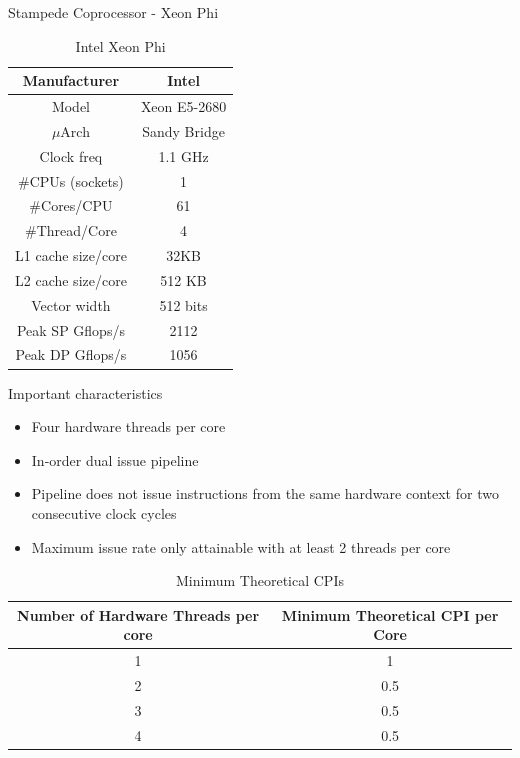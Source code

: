 \documentclass{beamer}
\begin{document}
\begin{frame}{Stampede Coprocessor - Xeon Phi}
\begin{table}[H]
\centering
\footnotesize
\begin{tabular}{| c | c |}\hline
Manufacturer & Intel\\ \hline
Model & Xeon E5-2680\\ \hline
$\mu$Arch & Sandy Bridge\\ \hline
Clock freq & 1.1 GHz\\ \hline
\#CPUs (sockets) & 1 \\ \hline
\#Cores/CPU & 61\\ \hline
\#Thread/Core & 4\\ \hline
L1 cache size/core & 32KB\\ \hline
L2 cache size/core & 512 KB\\ \hline
Vector width & 512 bits\\ \hline
Peak SP Gflops/s & 2112\\ \hline
Peak DP Gflops/s & 1056\\ \hline
\end{tabular}
\caption{Intel Xeon Phi}
\end{table}
\end{frame}

\begin{frame}{Important characteristics}
  \begin{itemize}
    \item Four hardware threads per core
    \item In-order dual issue pipeline
    \item Pipeline does not issue instructions from the same hardware
      context for two consecutive clock cycles
    \item Maximum issue rate only attainable with at least 2 threads per
      core
  \end{itemize}
\end{frame}

\begin{frame}
\begin{table}[H]
\centering
\footnotesize
\begin{tabular}{| c | c |}\hline
Number of Hardware Threads per core & Minimum Theoretical CPI per Core\\ \hline
1 & 1\\ \hline
2 & 0.5\\ \hline
3 & 0.5\\ \hline
4 & 0.5\\ \hline
\end{tabular}
\caption{Minimum Theoretical CPIs}
\end{table}
\end{frame}
\end{document}
